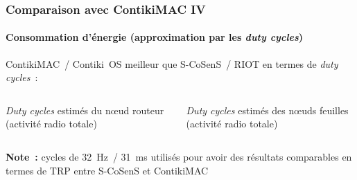 \documentclass[10pt,c]{beamer}
\newcommand{\lang}[1]{\textit{#1}}
\begin{document}
\begin{frame}[label=comparContikiMAC4]
\frametitle{Comparaison avec ContikiMAC IV}
\framesubtitle{Consommation d'énergie (approximation par les
                \lang{duty cycles})}

ContikiMAC~/ Contiki~OS meilleur que S-CoSenS~/ RIOT en termes de
\lang{duty cycles}~:

\vspace{-0.25cm}

\begin{columns}[c]

\begin{column}{5.5cm}


\footnotesize{\lang{Duty cycles} estimés du n{\oe}ud routeur
               (activité radio totale)}

\end{column}

\begin{column}{5.5cm}


\footnotesize{\lang{Duty cycles} estimés des n{\oe}uds feuilles
               (activité radio totale)}

\end{column}

\end{columns}

\vspace{0.3cm}

\scriptsize{\textbf{Note~:} cycles de 32~Hz~/ 31~ms utilisés pour avoir
 des résultats comparables en termes de TRP entre S-CoSenS et ContikiMAC}

\end{frame}
\end{document}
